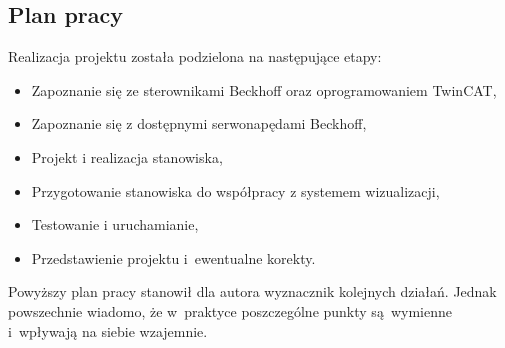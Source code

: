 \subsection{Plan pracy}
Realizacja projektu została podzielona na następujące etapy:
\begin{itemize}
\item Zapoznanie się ze sterownikami Beckhoff oraz oprogramowaniem TwinCAT,
\item Zapoznanie się z dostępnymi serwonapędami Beckhoff,
\item Projekt i realizacja stanowiska,
\item Przygotowanie stanowiska do współpracy z systemem wizualizacji,
\item Testowanie i uruchamianie,
\item Przedstawienie projektu i~ewentualne korekty.
\end{itemize}
\indent
\indent Powyższy plan pracy stanowił dla autora wyznacznik kolejnych działań. Jednak powszechnie wiadomo, że w~praktyce poszczególne punkty są~wymienne i~wpływają na siebie wzajemnie.